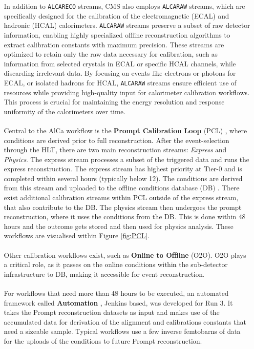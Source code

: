 In addition to \texttt{ALCARECO} streams, CMS also employs \texttt{ALCARAW} streams, which are specifically designed for the calibration of the electromagnetic (ECAL) and hadronic (HCAL) calorimeters. \texttt{ALCARAW} streams preserve a subset of raw detector information, enabling highly specialized offline reconstruction algorithms to extract calibration constants with maximum precision. 
These streams are optimized to retain only the raw data necessary for calibration, such as information from selected crystals in ECAL or specific HCAL channels, while discarding irrelevant data. By focusing on events like electrons or photons for ECAL, or isolated hadrons for HCAL, \texttt{ALCARAW} streams ensure efficient use of resources while providing high-quality input for calorimeter calibration workflows. This process is crucial for maintaining the energy resolution and response uniformity of the calorimeters over time.\\ \\
Central to the AlCa workflow is the \textbf{Prompt Calibration Loop} (PCL) \cite{David_Futyan_2010,Cerminara_2015}, where conditions are derived prior to full reconstruction. After the event-selection through the HLT, there are two main reconstruction streams: \textit{Express} and \textit{Physics}. The express stream processes a subset of the triggered data and runs the express reconstruction. The express stream has highest priority at Tier-0 and is completed within several hours (typically below 12). The conditions are derived from this stream and uploaded to the offline conditions database (DB) \cite{di2015cms}. There exist additional calibration streams within PCL outside of the express stream, that also contribute to the DB.
The physics stream then undergoes the prompt reconstruction, where it uses the conditions from the DB. This is done within 48 hours and the outcome gets stored and then used for physics analysis. These workflows are visualised within Figure \ref{fig:PCL}. 
\\ \\
Other calibration workflows exist, such as \textbf{Online to Offline} (O2O). O2O plays a critical role, as it passes on the online conditions within the sub-detector infrastructure to DB, making it accessible for event reconstruction.
\\ \\
For workflows that need more than 48 hours to be executed, an automated framework called \textbf{Automation} \cite{Pigazzini:2853679}, Jenkins based, was developed for Run 3. It takes the Prompt reconstruction datasets as input and makes use of the accumulated data for derivation of the alignment and calibrations constants that need a sizeable sample. Typical workflows use a few inverse femtobarns of data for the uploads of the conditions to future Prompt reconstruction.  

